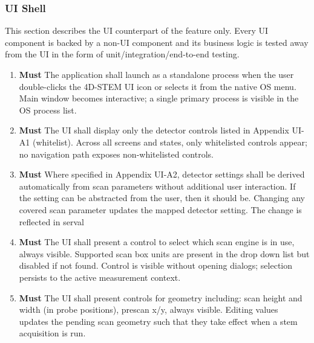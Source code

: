 \documentclass[12pt]{article}
\newcommand{\PriorityTag}[2]{%
  \colorbox{#2!25}{\footnotesize\textsf{\textbf{#1}}}\hspace{0.6em}}
\newcommand{\must}{\leavevmode\PriorityTag{Must}{green}}
\newcounter{reqgrp}[section] %
\newcounter{reqno}
\newcommand{\reqprefix}{GEN}
\newenvironment{requirements}[1]{%
  \renewcommand{\reqprefix}{#1}%
  \refstepcounter{reqgrp}%
  \setcounter{reqno}{0}%
  \begin{enumerate}[leftmargin=*]
}{\end{enumerate}}
\begin{document}
\subsubsection{UI Shell}

This section describes the UI counterpart of the feature only. Every UI component is backed by a non-UI component and its business logic is tested away from the UI in the form of unit/integration/end-to-end testing.

\begin{requirements}{UI}

\item \must {}
  {The application shall launch as a standalone process when the user double-clicks the 4D-STEM UI icon or selects it from the native OS menu.}
  {Main window becomes interactive; a single primary process is visible in the OS process list.}

\item \must {}
  { The UI shall display only the detector controls listed in Appendix UI-A1 (whitelist).}
  {Across all screens and states, only whitelisted controls appear; no navigation path exposes non-whitelisted controls.}

\item \must {}
  { Where specified in Appendix UI-A2, detector settings shall be derived automatically from scan parameters without additional user interaction. If the setting can be abstracted from the user, then it should be.}
  {Changing any covered scan parameter updates the mapped detector setting. The change is reflected in serval}

\item \must {}
  {The UI shall present a control to select which scan engine is in use, always visible. Supported scan box units are present in the drop down list but disabled if not found.}
  {Control is visible without opening dialogs; selection persists to the active measurement context.}

\item \must {}
  {The UI shall present controls for geometry including: scan height and width (in probe positions), prescan x/y, always visible.}
  {Editing values updates the pending scan geometry such that they take effect when a stem acquisition is run.}


\end{requirements}
\end{document}
